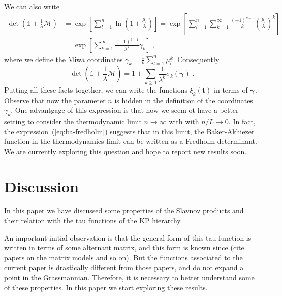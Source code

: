 \documentclass[a4paper,12pt]{amsart}
\begin{document}
We can also write 
\begin{equation}
  \begin{split}
    \det \left( \mathbb{1} + \frac{1}{\lambda} \mathcal{M}\right)
    & = \exp\left[ \sum_{l=1}^n \ln \left( 1 + \frac{\mu_l}{\lambda} \right)\right]
    = \exp\left[ \sum_{l=1}^n \sum_{k=1}^\infty \frac{(-1)^{k-1}}{k} \left(\frac{\mu_l}{\lambda} \right)^k\right] \\ 
    & = \exp\left[ \sum_{k=1}^\infty \frac{(-1)^{k-1}}{\lambda^k} \gamma_k\right] \; ,
  \end{split}
\end{equation}
where we define the Miwa coordinates \(\gamma_k = \frac{1}{k}\sum_{l=1}^n \mu_l^k \). Consequently
\begin{equation}
    \det \left( \mathbb{1} + \frac{1}{\lambda} \mathcal{M}\right)
     = 1 + \sum_{k\geq 1}\frac{1}{\lambda^k} \sigma_k(\bm{\gamma})\; .
\end{equation}
Putting all these facts together, we can write the functions
\(\xi_k(\bm{t})\) in terms of \(\bm{\gamma}\).  Observe that now the
parameter \(n\) is hidden in the definition of the coordinates
\(\gamma_k\).  One advantgage of this expression is that now we seem
ot have a better setting to consider the thermodynamic limit \(n \to
\infty\) with with \(n/L \to 0\). In fact, the
expression~(\ref{eq:ba-fredholm}) suggests that in this limit, the
Baker-Akhiezer function in the thermodynamics limit can be written as
a Fredholm determinant. We are currently exploring this question and
hope to report new results soon.


\section{Discussion}

In this paper we have discussed some properties of the Slavnov
products and their relation with the tau functions of the KP
hierarchy.

An important initial observation is that the general form of this tau
function is written in terms of some alternant matrix, and this form
is known since (cite papers on the matrix models and so on). But the
functions associated to the current paper is drastically different
from those papers, and do not expand a point in the
Grassmannian. Therefore, it is necessary to better understand some of
these properties. In this paper we start exploring these results.
\end{document}
